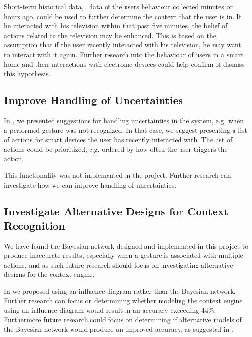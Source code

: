 Short-term historical data, \ie~data of the users behaviour collected minutes or hours ago, could be used to further determine the context that the user is in. If he interacted with his television within that past five minutes, the belief of actions related to the television may be enhanced. This is based on the assumption that if the user recently interacted with his television, he may want to interact with it again. Further research into the behaviour of users in a smart home and their interactions with electronic devices could help confirm of dismiss this hypothesis.

\subsection{Improve Handling of Uncertainties}

In , we presented suggestions for handling uncertainties in the system, e.g. when a performed gesture was not recognized. In that case, we suggest presenting a list of actions for smart devices the user has recently interacted with.
The list of actions could be prioritized, e.g. ordered by how often the user triggers the action.

This functionality was not implemented in the project. Further research can investigate how we can improve handling of uncertainties.

\subsection{Investigate Alternative Designs for Context Recognition}

We have found the Bayesian network designed and implemented in this project to produce inaccurate results, especially when a gesture is associated with multiple actions, and as such future research should focus on investigating alternative designs for the context engine.

In  we proposed using an influence diagram rather than the Bayesian network. Further research can focus on determining whether modeling the context engine using an influence diagram would result in an accuracy exceeding 44\%. Furthermore future research could focus on determining if alternative models of the Bayesian network would produce an improved accuracy, as suggested in .

